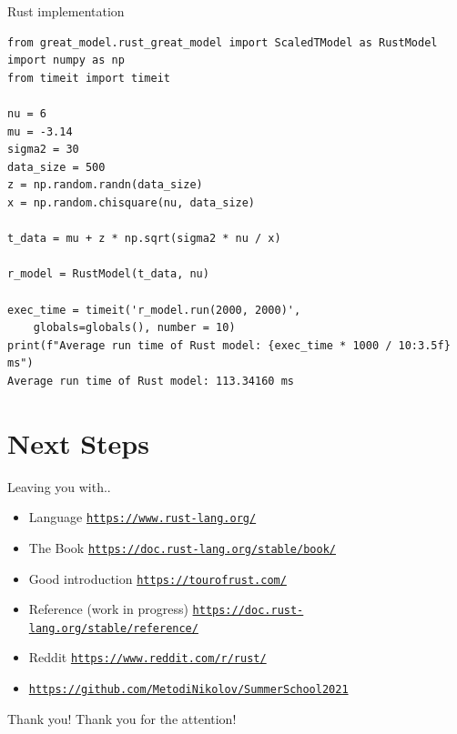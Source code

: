 \documentclass[8pt]{beamer}
\begin{document}
\begin{frame}[fragile]{Rust implementation}
\begin{verbatim}
from great_model.rust_great_model import ScaledTModel as RustModel
import numpy as np
from timeit import timeit

nu = 6
mu = -3.14
sigma2 = 30
data_size = 500
z = np.random.randn(data_size)
x = np.random.chisquare(nu, data_size)

t_data = mu + z * np.sqrt(sigma2 * nu / x)

r_model = RustModel(t_data, nu)

exec_time = timeit('r_model.run(2000, 2000)', 
	globals=globals(), number = 10)
print(f"Average run time of Rust model: {exec_time * 1000 / 10:3.5f} ms")
Average run time of Rust model: 113.34160 ms
\end{verbatim}
\end{frame}

\section{Next Steps}
\begin{frame}{Leaving you with..}
\begin{itemize}
	\item Language \texttt{\url{https://www.rust-lang.org/}}
	\item The Book \texttt{\url{https://doc.rust-lang.org/stable/book/}}
	\item Good introduction \texttt{\url{https://tourofrust.com/}}
	\item Reference (work in progress) \texttt{\url{https://doc.rust-lang.org/stable/reference/}}
	\item Reddit \texttt{\url{https://www.reddit.com/r/rust/}}

	\item \texttt{\url{https://github.com/MetodiNikolov/SummerSchool2021}}
\end{itemize}
\end{frame}

\begin{frame}{Thank you!}
\huge Thank you for the attention!
\end{frame}
\end{document}
